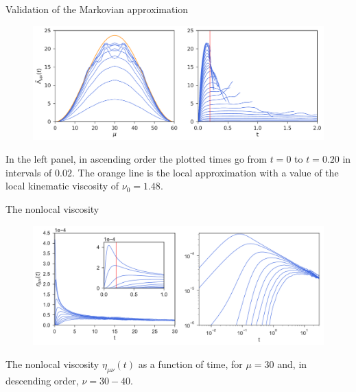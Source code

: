 \documentclass{beamer}
\begin{document}
\begin{frame}{Validation of the Markovian approximation}
\begin{figure}[h!]
\includegraphics[width=\linewidth]{LambdatFourier-PBC}
\end{figure}
In  the left  panel, in
  ascending  order the  plotted times  go  from $t=0$  to $t=0.20$  in
  intervals of $0.02$.  The orange line is the local approximation
  with a  value of the local  kinematic viscosity of
  $\nu_0=1.48$.
 \end{frame}
\begin{frame}{The nonlocal viscosity}
\begin{figure}
\includegraphics[width=\linewidth]{Etat-PBC}
\end{figure}
The nonlocal viscosity $\eta_{\mu\nu}(t)$ as a function of time, for $\mu=30$ and, in descending order, $\nu=30-40$. 
\end{frame}
\end{document}

